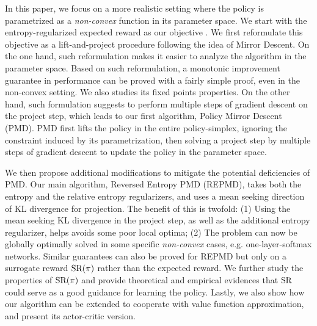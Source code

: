 In this paper, we focus on a more realistic setting where the policy is parametrized as a \emph{non-convex} function in its parameter space. 
We start with the entropy-regularized expected reward as our objective \citep{williams1991function,fox2015taming,schulman2017equivalence,nachum2017bridging,haarnoja2017reinforcement}. 
We first reformulate this objective as a lift-and-project procedure following the idea of Mirror Descent.
On the one hand, such reformulation makes it easier to analyze the algorithm in the parameter space.
Based on such reformulation, a monotonic improvement guarantee in performance can be proved with a fairly simple proof, even in the non-convex setting.
We also studies its fixed points properties.
On the other hand, such formulation suggests to perform multiple steps of gradient descent on the project step, which leads to our first algorithm, Policy Mirror Descent (PMD). 
 PMD first lifts the policy in the entire policy-simplex, ignoring the constraint induced by its parametrization, then solving a project step by multiple steps of gradient descent to update the policy in the parameter space. 

We then propose additional modifications to mitigate the potential deficiencies of PMD.
Our main algorithm, Reversed Entropy PMD (REPMD),  takes both the entropy and the relative entropy regularizers, and uses a mean seeking direction of KL divergence for projection.
The benefit of this is twofold: (1) Using the mean seeking KL divergence in the project step, as well as the additional entropy regularizer, helps avoids some poor local optima; (2) The problem can now be globally optimally solved in some specific \emph{non-convex} cases, e.g. one-layer-softmax networks.
Similar guarantees can also be proved for REPMD but only on a surrogate reward $\text{SR}(\pi)$ rather than the expected reward. 
We further study the properties of $\text{SR}(\pi)$ and provide theoretical and empirical evidences that $\text{SR}$ could serve as a good guidance for learning the policy.
Lastly, we also show how our algorithm can be extended to cooperate with value function approximation, and present its  actor-critic version. 


